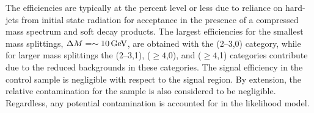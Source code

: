 
The efficiencies are typically at the percent level or less due to
reliance on hard-\Pt jets from initial state radiation for acceptance
in the presence of a compressed mass spectrum and soft decay
products. The largest efficiencies for the smallest mass splittings,
$\Delta M = \sim10\,\text{Ge\hspace{-.08em}V}$, are obtained with the (2--3,0) category,
while for larger mass splittings the (2--3,1), ($\geq 4$,0), and
($\geq 4$,1) categories contribute due to the reduced backgrounds in
these categories. The signal efficiency in the \mj control sample is
negligible with respect to the signal region. By extension, the
relative contamination for the \mmj sample is also considered to be
negligible. Regardless, any potential contamination is accounted for
in the likelihood model.

%


